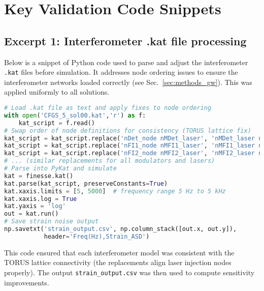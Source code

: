 \documentclass[12pt]{article}
\begin{document}
\appendix
\section{Key Validation Code Snippets}\label{app:code}
\subsection*{Excerpt 1: Interferometer .kat file processing}
Below is a snippet of Python code used to parse and adjust the interferometer \texttt{.kat} files before simulation. It addresses node ordering issues to ensure the interferometer networks loaded correctly (see Sec.~\ref{sec:methods_gw}). This was applied uniformly to all solutions.
\begin{lstlisting}[language=Python]
# Load .kat file as text and apply fixes to node ordering
with open('CFGS_5_sol00.kat','r') as f:
    kat_script = f.read()
# Swap order of node definitions for consistency (TORUS lattice fix)
kat_script = kat_script.replace('nDet_node nMDet_laser', 'nMDet_laser nDet_node')
kat_script = kat_script.replace('nFI1_node nMFI1_laser', 'nMFI1_laser nFI1_node')
kat_script = kat_script.replace('nFI2_node nMFI2_laser', 'nMFI2_laser nFI2_node')
# ... (similar replacements for all modulators and lasers)
# Parse into PyKat and simulate
kat = finesse.kat()
kat.parse(kat_script, preserveConstants=True)
kat.xaxis.limits = [5, 5000]  # frequency range 5 Hz to 5 kHz
kat.xaxis.log = True
kat.yaxis = 'log'
out = kat.run()
# Save strain noise output
np.savetxt('strain_output.csv', np.column_stack([out.x, out.y]), 
           header='Freq(Hz),Strain_ASD')
\end{lstlisting}
This code ensured that each interferometer model was consistent with the TORUS lattice connectivity (the replacements align laser injection nodes properly). The output \texttt{strain\_output.csv} was then used to compute sensitivity improvements.
\end{document}
